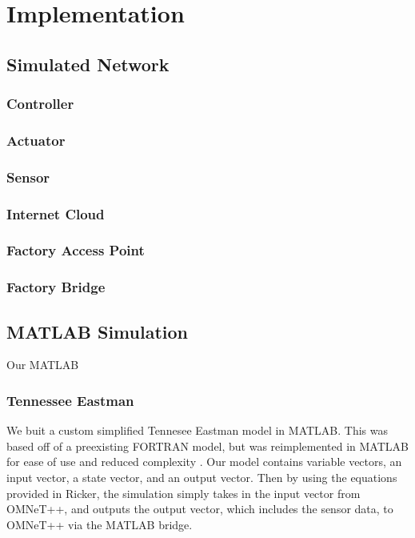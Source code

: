 \section{Implementation}
\subsection{Simulated Network}

\subsubsection{Controller}

\subsubsection{Actuator}

\subsubsection{Sensor}

\subsubsection{Internet Cloud}

\subsubsection{Factory Access Point}

\subsubsection{Factory Bridge}

\subsection{MATLAB Simulation}
  Our MATLAB 

\subsubsection{Tennessee Eastman}
  We buit a custom simplified Tennesee Eastman model in MATLAB.  
  This was based off of a preexisting FORTRAN model, but was
  reimplemented in MATLAB for ease of use and reduced complexity 
  .  Our model contains variable vectors, an
  input vector, a state vector, and an output vector. Then by 
  using the equations provided in Ricker, the
  simulation simply takes in the input vector from OMNeT++, and
  outputs the output vector, which includes the sensor data, to
  OMNeT++ via the MATLAB bridge.

